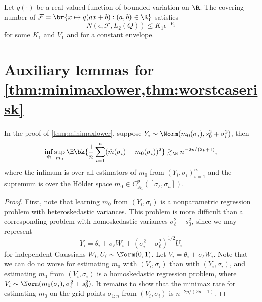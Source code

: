 \documentclass[12pt, reqno]{amsart}
\newcommand{\sigl}{\sigma_\ell}
\newcommand{\sigu}{\sigma_u}
\newcommand{\hatm}{\hat m}
\numberwithin{equation}{section}
\begin{document}
\begin{refsection}
\begin{appendices}
\begin{lemma}
\label{lemma:sen2018}
Let $q(\cdot)$ be a real-valued function of bounded variation on
$\R$. The covering number of $\mathcal F = \br{x \mapsto q(ax + b) : (a,b) \in \R}$
satisfies \[
N(\epsilon, \mathcal F, L_2(Q)) \le K_1 \epsilon^{-V_1}
\]
for some $K_1$ and $V_1$ and for a constant envelope.
\end{lemma}





























\section{Auxiliary lemmas for \cref{thm:minimaxlower,thm:worstcaserisk}}



\begin{lemma}
\label{lemma:minimax}
In the proof of \cref{thm:minimaxlower}, suppose $Y_i \sim \Norm(m_0(\sigma_i), s_0^2 +
\sigma_i^2)$, then 
\[\inf_{\hatm} \sup_{m_0}  \E\bk{\frac{1}{n} \sum_{i=1}^n (\hat
m(\sigma_i) - m_0 (\sigma_i))^2}\gtrsim_\H n^{-2p/(2p+1)},\] where the infimum is over all
estimators of $m_0$ from $(Y_i, \sigma_i)_{i=1}^n$ and the supremum is over the H\"older
space $m_0 \in C_{A_1}^p([\sigl, \sigu])$.
\end{lemma}

\begin{proof} 

First, note that learning $m_0$ from $(Y_i, \sigma_i)$ is a nonparametric
regression problem with heteroskedastic variances. This problem is more difficult than
a corresponding problem with homoskedastic variances $\sigl^2 + s_0^2$, since we may
represent \[
Y_i = \theta_i + \sigl W_i + (\sigma_i^2 - \sigl^2)^{1/2} U_i
\]
for independent Gaussians $W_i, U_i \sim \Norm(0,1)$. Let $V_i = \theta_i + \sigl W_i$.
Note that we can do no worse for estimating $m_0$ with $(V_i, \sigma_i)$ than with $(Y_i,
\sigma_i)$, and estimating $m_0$ from $(V_i, \sigma_i)$ is a homoskedastic regression
problem, where $V_i \sim \Norm(m_0(\sigma_i), \sigl^2 + s_0^2)$. It remains to show that
the minimax rate for estimating $m_0$ on the grid points $\sigma_ {1:n}$ from $(V_i,
\sigma_i)$ is $n^{-2p/(2p+1)}$.


\end{proof}
\end{appendices}
\end{refsection}
\end{document}
